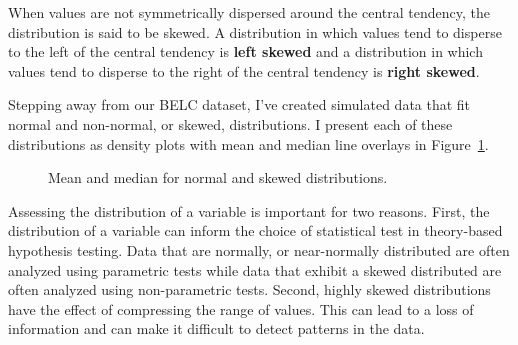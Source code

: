 \documentclass[
  letterpaper,
  DIV=11,
  numbers=noendperiod]{scrreprt}
\theoremstyle{definition}
\theoremstyle{remark}
\begin{document}
When values are not symmetrically dispersed around the central tendency,
the distribution is said to be skewed. A distribution in which values
tend to disperse to the left of the central tendency is \textbf{left
skewed} and a distribution in which values tend to disperse to the right
of the central tendency is \textbf{right skewed}.

Stepping away from our BELC dataset, I've created simulated data that
fit normal and non-normal, or skewed, distributions. I present each of
these distributions as density plots with mean and median line overlays
in Figure~\ref{fig-aa-distributions}.

\begin{figure}[H]

\begin{minipage}{0.33\linewidth}



\end{minipage}%
%
\begin{minipage}{0.33\linewidth}



\end{minipage}%
%
\begin{minipage}{0.33\linewidth}



\end{minipage}%

\caption{\label{fig-aa-distributions}Mean and median for normal and
skewed distributions.}

\end{figure}%

Assessing the distribution of a variable is important for two reasons.
First, the distribution of a variable can inform the choice of
statistical test in theory-based hypothesis testing. Data that are
normally, or near-normally distributed are often analyzed using
parametric tests while data that exhibit a skewed distributed are often
analyzed using non-parametric tests. Second, highly skewed distributions
have the effect of compressing the range of values. This can lead to a
loss of information and can make it difficult to detect patterns in the
data.
\end{document}
